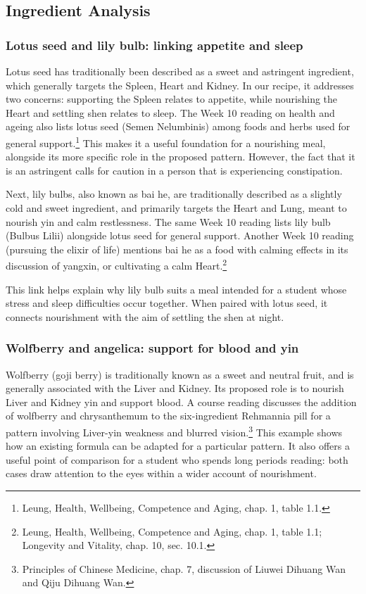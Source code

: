 \documentclass[12pt,a4paper]{article}
\begin{document}
\subsection{Ingredient Analysis}
\subsubsection*{Lotus seed and lily bulb: linking appetite and sleep}
Lotus seed has traditionally been described as a sweet and astringent ingredient, which generally targets the Spleen, Heart and Kidney. In our recipe, it addresses two concerns: supporting the Spleen relates to appetite, while nourishing the Heart and settling shen relates to sleep. The Week 10 reading on health and ageing also lists lotus seed (Semen Nelumbinis) among foods and herbs used for general support.\footnote{Leung, Health, Wellbeing, Competence and Aging, chap. 1, table 1.1.} This makes it a useful foundation for a nourishing meal, alongside its more specific role in the proposed pattern. However, the fact that it is an astringent calls for caution in a person that is experiencing constipation.

Next, lily bulbs, also known as bai he, are traditionally described as a slightly cold and sweet ingredient, and primarily targets the Heart and Lung, meant to nourish yin and calm restlessness. The same Week 10 reading lists lily bulb (Bulbus Lilii) alongside lotus seed for general support. Another Week 10 reading (pursuing the elixir of life) mentions bai he as a food with calming effects in its discussion of yangxin, or cultivating a calm Heart.\footnote{Leung, Health, Wellbeing, Competence and Aging, chap. 1, table 1.1; Longevity and Vitality, chap. 10, sec. 10.1.}

This link helps explain why lily bulb suits a meal intended for a student whose stress and sleep difficulties occur together. When paired with lotus seed, it connects nourishment with the aim of settling the shen at night.

\subsubsection*{Wolfberry and angelica: support for blood and yin}
Wolfberry (goji berry) is traditionally known as a sweet and neutral fruit, and is generally associated with the Liver and Kidney. Its proposed role is to nourish Liver and Kidney yin and support blood. A course reading discusses the addition of wolfberry and chrysanthemum to the six-ingredient Rehmannia pill for a pattern involving Liver-yin weakness and blurred vision.\footnote{Principles of Chinese Medicine, chap. 7, discussion of Liuwei Dihuang Wan and Qiju Dihuang Wan.} This example shows how an existing formula can be adapted for a particular pattern. It also offers a useful point of comparison for a student who spends long periods reading: both cases draw attention to the eyes within a wider account of nourishment.
\end{document}
